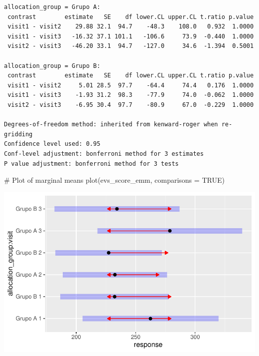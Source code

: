 \documentclass[
  letterpaper,
  DIV=11,
  numbers=noendperiod]{scrartcl}
\newenvironment{Shaded}{\begin{snugshade}}{\end{snugshade}}
\newcommand{\AttributeTok}[1]{\textcolor[rgb]{0.40,0.45,0.13}{#1}}
\newcommand{\CommentTok}[1]{\textcolor[rgb]{0.37,0.37,0.37}{#1}}
\newcommand{\ConstantTok}[1]{\textcolor[rgb]{0.56,0.35,0.01}{#1}}
\newcommand{\FunctionTok}[1]{\textcolor[rgb]{0.28,0.35,0.67}{#1}}
\newcommand{\NormalTok}[1]{\textcolor[rgb]{0.00,0.23,0.31}{#1}}
\begin{document}
\begin{verbatim}
allocation_group = Grupo A:
 contrast        estimate   SE    df lower.CL upper.CL t.ratio p.value
 visit1 - visit2    29.88 32.1  94.7    -48.3    108.0   0.932  1.0000
 visit1 - visit3   -16.32 37.1 101.1   -106.6     73.9  -0.440  1.0000
 visit2 - visit3   -46.20 33.1  94.7   -127.0     34.6  -1.394  0.5001

allocation_group = Grupo B:
 contrast        estimate   SE    df lower.CL upper.CL t.ratio p.value
 visit1 - visit2     5.01 28.5  97.7    -64.4     74.4   0.176  1.0000
 visit1 - visit3    -1.93 31.2  98.3    -77.9     74.0  -0.062  1.0000
 visit2 - visit3    -6.95 30.4  97.7    -80.9     67.0  -0.229  1.0000

Degrees-of-freedom method: inherited from kenward-roger when re-gridding 
Confidence level used: 0.95 
Conf-level adjustment: bonferroni method for 3 estimates 
P value adjustment: bonferroni method for 3 tests 
\end{verbatim}

\begin{Shaded}
\begin{Highlighting}[]
\CommentTok{\# Plot of marginal means}
\FunctionTok{plot}\NormalTok{(evs\_score\_emm, }\AttributeTok{comparisons =} \ConstantTok{TRUE}\NormalTok{)}
\end{Highlighting}
\end{Shaded}

\includegraphics{Outcomes_V1V2V3_files/figure-pdf/evs_score_sens_emm-1.pdf}
\end{document}
